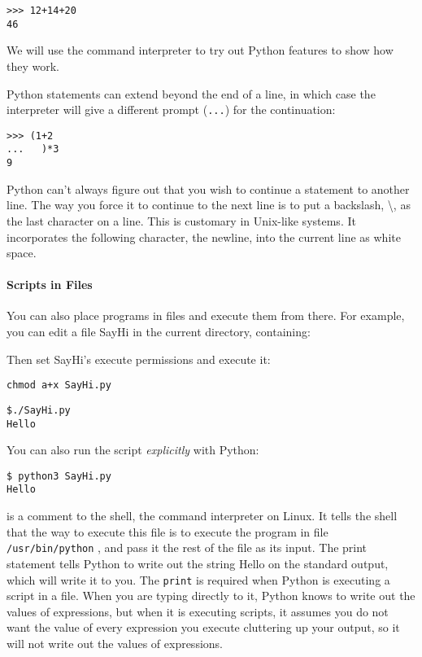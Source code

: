 \begin{verbatim}
>>> 12+14+20
46
\end{verbatim}

We will use the command interpreter
to try out Python features to show how they work.

Python statements can extend beyond
the end of a line, in which case the interpreter will give a different
prompt (\verb"...") for the continuation:

\begin{verbatim}
>>> (1+2
...   )*3
9
\end{verbatim}

Python can't always figure out
that you wish to continue a statement to another line. The way you force
it to continue to the next line is to put a backslash, \textbackslash{},
as the last character on a line. This is customary in Unix-like systems.
It incorporates the following character, the newline, into the current
line as white space.

\paragraph{Scripts in Files}
You can also place programs in
files and execute them from there. For example, you can edit a file
SayHi in the current directory, containing:

\resetlinenumber[1]
\linenumbers
\begin{tt}
  
\end{tt}
\nolinenumbers

Then set SayHi's execute permissions and execute it:

\begin{verbatim}
chmod a+x SayHi.py
\end{verbatim}

\begin{verbatim}
$./SayHi.py
Hello
\end{verbatim}

You can also run the script \emph{explicitly} with Python:

\begin{verbatim}
$ python3 SayHi.py
Hello
\end{verbatim}

is a comment to the shell, the command interpreter on Linux. It tells the
shell that the way to execute this file is to execute the program in
file \texttt{/usr/bin/python} , and pass it the rest of the file as its
input. The print statement tells Python to write out the string Hello on
the standard output, which will write it to you. The \texttt{print} is
required when Python is executing a script in a file. When you are
typing directly to it, Python knows to write out the values of
expressions, but when it is executing scripts, it assumes you do not
want the value of every expression you execute cluttering up your
output, so it will not write out the values of expressions.

